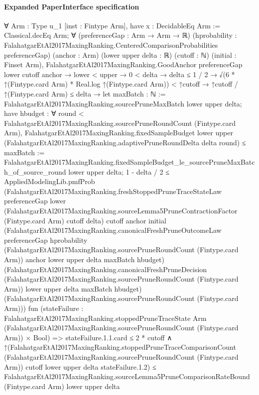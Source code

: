 \documentclass[10pt]{article}
\begin{document}
\paragraph{Expanded PaperInterface specification}
\begin{ReviewVerbatim}
∀ {Arm : Type u_1} [inst : Fintype Arm],
  have x : DecidableEq Arm := Classical.decEq Arm;
  ∀ (preferenceGap : Arm → Arm → ℝ)
    (hprobability : FalahatgarEtAl2017MaxingRanking.CenteredComparisonProbabilities preferenceGap) (anchor : Arm)
    (lower upper delta : ℝ) (cutoff : ℕ) (initial : Finset Arm),
    FalahatgarEtAl2017MaxingRanking.GoodAnchor preferenceGap lower cutoff anchor →
      lower < upper →
        0 < delta →
          delta ≤ 1 / 2 →
            √(6 * ↑(Fintype.card Arm) * Real.log ↑(Fintype.card Arm)) < ↑cutoff →
              ↑cutoff / ↑(Fintype.card Arm) ≤ delta →
                let maxBatch : ℕ := FalahatgarEtAl2017MaxingRanking.sourcePruneMaxBatch lower upper delta;
                have hbudget :
                  ∀ round < FalahatgarEtAl2017MaxingRanking.sourcePruneRoundCount (Fintype.card Arm),
                    FalahatgarEtAl2017MaxingRanking.fixedSampleBudget lower upper
                        (FalahatgarEtAl2017MaxingRanking.adaptivePruneRoundDelta delta round) ≤
                      maxBatch :=
                  FalahatgarEtAl2017MaxingRanking.fixedSampleBudget_le_sourcePruneMaxBatch_of_source_round lower upper
                    delta;
                1 - delta / 2 ≤
                  AppliedModelingLib.pmfProb
                    (FalahatgarEtAl2017MaxingRanking.freshStoppedPruneTraceStateLaw preferenceGap lower
                      (FalahatgarEtAl2017MaxingRanking.sourceLemma5PruneContractionFactor (Fintype.card Arm) cutoff
                        delta)
                      cutoff anchor initial
                      (FalahatgarEtAl2017MaxingRanking.canonicalFreshPruneOutcomeLaw preferenceGap hprobability
                        (FalahatgarEtAl2017MaxingRanking.sourcePruneRoundCount (Fintype.card Arm)) anchor lower upper
                        delta maxBatch hbudget)
                      (FalahatgarEtAl2017MaxingRanking.canonicalFreshPruneDecision
                        (FalahatgarEtAl2017MaxingRanking.sourcePruneRoundCount (Fintype.card Arm)) lower upper delta
                        maxBatch hbudget)
                      (FalahatgarEtAl2017MaxingRanking.sourcePruneRoundCount (Fintype.card Arm)))
                    fun
                      (stateFailure :
                        FalahatgarEtAl2017MaxingRanking.stoppedPruneTraceState Arm
                            (FalahatgarEtAl2017MaxingRanking.sourcePruneRoundCount (Fintype.card Arm)) ×
                          Bool) =>
                    stateFailure.1.1.card ≤ 2 * cutoff ∧
                      ↑(FalahatgarEtAl2017MaxingRanking.stoppedPruneTraceComparisonCount
                            (FalahatgarEtAl2017MaxingRanking.sourcePruneRoundCount (Fintype.card Arm)) cutoff lower
                            upper delta stateFailure.1.2) ≤
                        FalahatgarEtAl2017MaxingRanking.sourceLemma5PruneComparisonRateBound (Fintype.card Arm) lower
                          upper delta
\end{ReviewVerbatim}
\end{document}
